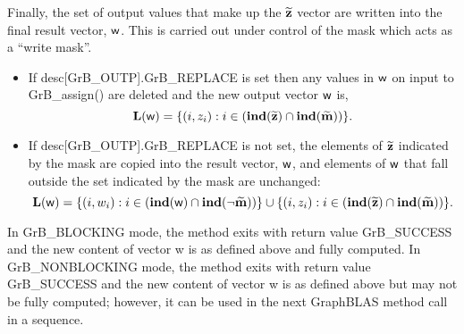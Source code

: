 Finally, the set of output values that make up the ${\bf \widetilde{z}}$ 
vector are written into the final result vector, ${\sf w}$. 
This is carried out under control of the mask which acts as a ``write mask''.
\begin{itemize}
\item If {\sf desc[GrB\_OUTP].GrB\_REPLACE} is set then any values in ${\sf w}$ 
on input to {\sf GrB\_assign()} are deleted and the new output vector ${\sf w}$ is,
\[ \bold{L}({\sf w}) = \{(i,z_{i}) : i \in (\bold{ind}({\bf \widetilde{z}}) 
\cap \bold{ind}({\bf \widetilde{m}})) \}. \]

\item If {\sf desc[GrB\_OUTP].GrB\_REPLACE} is not set, the elements of ${\bf \widetilde{z}}$ indicated by 
the mask are copied into the result vector, ${\sf w}$, and elements of 
${\sf w}$ that fall outside the set indicated by the mask are unchanged:
\[ \bold{L}({\sf w}) = \{(i,w_{i}) : i \in (\bold{ind}({\bf \sf w}) 
\cap \bold{ind}(\neg {\bf \widetilde{m}})) \} \cup \{(i,z_{i}) : i \in 
(\bold{ind}({\bf \widetilde{z}}) \cap \bold{ind}({\bf \widetilde{m}})) \}. \]
\end{itemize}

In {\sf GrB\_BLOCKING} mode, the method exits with return value 
{\sf GrB\_SUCCESS} and the new content of vector {\sf w} is as defined above
and fully computed.  
In {\sf GrB\_NONBLOCKING} mode, the method exits with return value 
{\sf GrB\_SUCCESS} and the new content of vector {\sf w} is as defined above 
but may not be fully computed; however, it can be used in the next GraphBLAS 
method call in a sequence.


